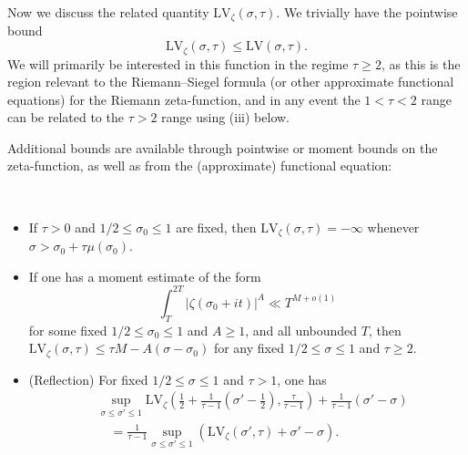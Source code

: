 \documentclass[a4paper, 10pt]{amsart}
\newcommand{\LV}{\mathrm{LV}}
\begin{document}
Now we discuss the related quantity $\LV_\zeta(\sigma,\tau)$.  We trivially have the pointwise bound
\begin{equation}\label{lvz-lv}
\LV_\zeta(\sigma,\tau) \leq \LV(\sigma,\tau).
\end{equation}
We will primarily be interested in this function in the regime $\tau \geq 2$, as this is the region relevant to the Riemann--Siegel formula (or other approximate functional equations) for the Riemann zeta-function, and in any event the $1 < \tau < 2$ range can be related to the $\tau>2$ range using (iii) below.

Additional bounds are available through pointwise or moment bounds on the zeta-function, as well as from the (approximate) functional equation:

\begin{lemma}\label{add-bound}\
\begin{itemize}
\item[(i)] If $\tau>0$ and $1/2 \leq \sigma_0 \leq 1$ are fixed, then $\LV_\zeta(\sigma,\tau) = -\infty$ whenever $\sigma > \sigma_0 + \tau \mu(\sigma_0)$.
\item[(ii)]  If one has a moment estimate of the form
\begin{equation}\label{moment}
    \int_T^{2T} |\zeta(\sigma_0+it)|^A \ll T^{M+o(1)}
\end{equation}
for some fixed $1/2 \leq \sigma_0 \leq 1$ and $A \geq 1$, and all unbounded $T$, then $\LV_\zeta(\sigma,\tau) \leq \tau M - A(\sigma-\sigma_0)$ for any fixed $1/2 \leq \sigma \leq 1$ and $\tau \geq 2$.
\item[(iii)] (Reflection) For fixed $1/2 \leq \sigma \leq 1$ and $\tau > 1$, one has
\begin{align*}
    & \sup_{\sigma \leq \sigma' \leq 1} \LV_\zeta\left(\frac{1}{2} + \frac{1}{\tau-1} \left(\sigma'-\frac{1}{2}\right), \frac{\tau}{\tau-1}\right) + \frac{1}{\tau-1} (\sigma'-\sigma) \\
    &\quad = \frac{1}{\tau-1} \sup_{\sigma \leq \sigma' \leq 1} (\LV_\zeta(\sigma',\tau) + \sigma'-\sigma).
\end{align*}
\end{itemize}
\end{lemma}
\end{document}
